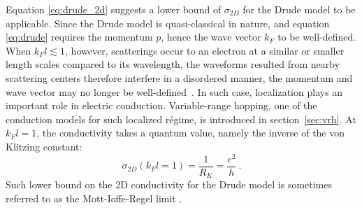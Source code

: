 Equation \ref{eq:drude_2d} suggests a lower bound of $\sigma_{2D}$ for the Drude model to be applicable. Since the Drude model is quasi-classical in nature, and equation \ref{eq:drude} requires the momentum $p$, hence the wave vector $k_F$ to be well-defined. When $k_F l \lesssim 1$, however, scatterings occur to an electron at a similar or smaller length scales compared to its wavelength, the waveforms resulted from nearby scattering centers therefore interfere in a disordered manner, the momentum and wave vector may no longer be well-defined~\cite{WL_ee}. In such case, localization plays an important role in electric conduction. Variable-range hopping, one of the conduction models for such localized r\'egime, is introduced in section~\ref{sec:vrh}. At $k_F l = 1$, the conductivity takes a quantum value, namely the inverse of the von Klitzing constant:%
\begin{equation}
    \sigma_{2D}(k_F l = 1) = \frac{1}{R_K} = \frac{e^2}{h}~.
\end{equation}%
Such lower bound on the 2D conductivity for the Drude model is sometimes referred to as the Mott-Ioffe-Regel limit \cite{mott_book, hussey2004}.